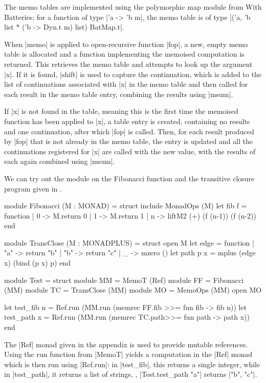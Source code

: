 The memo tables are implemented using the polymorphic map module
from \OCaml With Batteries; for a function of type |'a -> 'b m|, the memo
table is of type |('a, 'b list * ('b -> Dyn.t m) list) BatMap.t|.

When |memo| is applied to open-recursive function |fop|, a new, empty memo 
table is allocated and a function
implementing the memoised computation is returned. This 
retrieves the memo table and attempts to look up the argument |x|. If it is
found, |shift| is used to capture the continuation, which is
added to the list of continuations associated
with |x| in the memo table and then called for each result in the memo table entry,
combining the results using |msum|. 

If |x| is not found in the table, meaning this is the first time the memoised 
function has been applied to |x|,
a table entry is created, containing no results and one continuation,
after which |fop| is called. Then, for each result produced by |fop| that
is not already in the memo table,
the entry is updated and all the continuations registered 
for |x| are called with the new value, with the results of each again combined using |msum|.

We can try out the module on the Fibonacci function and the transitive closure 
program given in .
\begin{ocaml}
	module Fibonacci (M : MONAD) = struct
		include MonadOps (M)
		let fib f = function | 0 -> M.return 0 | 1 -> M.return 1
												 | n -> liftM2 (+) (f (n-1)) (f (n-2))
	end

	module TransClose (M : MONADPLUS) = struct
		open M
		let edge = function | "a" -> return "b"
												| "b" -> return "c"
												|  _  -> mzero ()
		let path p x = mplus (edge x) (bind (p x) p) 
	end

	module Test = struct
		module MM = MemoT (Ref)
		module FF = Fibonacci (MM)
		module TC = TransClose (MM)
		module MO = MemoOps (MM)
		open MO

		let test_fib n = Ref.run (MM.run (memrec FF.fib >>= fun fib -> fib n))
		let test_path x = Ref.run (MM.run (memrec TC.path>>= fun path -> path x))
	end
\end{ocaml}
The |Ref| monad given in the appendix is used to provide
mutable references.
Using the run function from |MemoT| yields a computation in the |Ref|
monad which is then run using |Ref.run|: in |test_fib|, this returns a single
integer, while in |test_path|, it returns a list of strings, \eg,
|Test.test_path "a"| returns |{"b", "c"}|.

